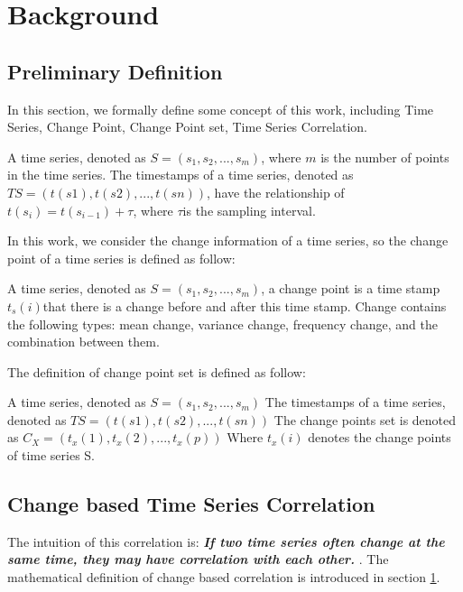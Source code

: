 \section{Background}
\label{sec:formulation}

\subsection{Preliminary Definition}

In this section, we formally define some concept of this work, including Time Series, Change Point, Change Point set, Time Series Correlation.

\begin{definition}
A time series, denoted as $S = (s_1,s_2,...,s_m)$, where $m$ is the number of points in the time series. The timestamps of a time series, denoted as $TS = (t(s1), t(s2),..., t(sn))$, have the relationship of $t(s_i) = t(s_{i-1})+\tau$, where $\tau$is the sampling interval.
\end{definition}

In this work, we consider the change information of a time series, so the change point of a time series is defined as follow:
\begin{definition}
A time series, denoted as $S = (s_1,s_2,...,s_m)$, a change point is a time stamp $t_s(i)$that there is a change before and after this time stamp. Change contains the following types: mean change, variance change,  frequency change, and the combination between them.
\end{definition}

The definition of change point set is defined as follow:
\begin{definition}
A time series, denoted as
$S = (s_1,s_2,...,s_m)$
The timestamps of a time series, denoted as 
$TS = (t(s1), t(s2),..., t(sn))$
The change points set is denoted as 
$C_X=(t_x(1),t_x(2),...,t_x(p))$
Where $t_x(i)$ denotes the change points of time series S.
\end{definition}


\subsection{Change based Time Series Correlation}

The intuition of this correlation is: 
\textbf{\textit{If two time series often change at the same time, they may have correlation with each other.} }. The mathematical definition of change based correlation is introduced in section \ref{sec:formulation}. 

